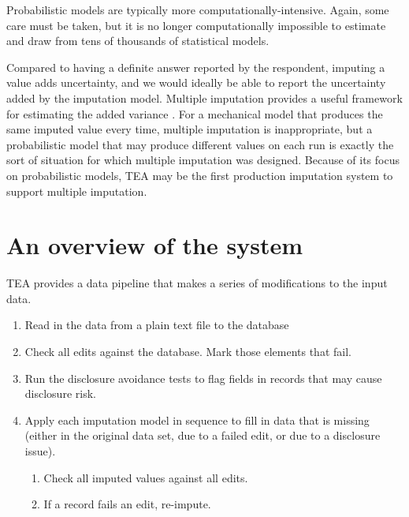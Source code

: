 \documentclass{article}
\begin{document}
Probabilistic models are typically more computationally-intensive. Again, some care
must be taken, but it is no longer computationally impossible to estimate and draw
from tens of thousands of statistical models.

Compared to having a definite answer reported by the respondent, imputing a value
adds uncertainty, and we would ideally be able to report the uncertainty added by the
imputation model. Multiple imputation provides a useful framework for estimating the
added variance \citep{multiimpute}. For a mechanical model that produces the same
imputed value every time, multiple imputation is inappropriate, but a probabilistic
model that may produce different values on each run is exactly the sort of situation
for which multiple imputation was designed. Because of its focus on probabilistic models,
TEA may be the first production imputation system to support multiple imputation.







\section{An overview of the system}

TEA provides a data pipeline that makes a series of modifications to the input data. 

\begin{enumerate}
\item Read in the data from a plain text file to the database
\item Check all edits against the database. Mark those elements that fail.
\item Run the disclosure avoidance tests to flag fields in records that may cause
disclosure risk. 
\item Apply each imputation model in sequence to fill in data that is missing (either
in the original data set, due to a failed edit, or due to a disclosure issue).
    \begin{enumerate}
        \item Check all imputed values against all edits.
        \item If a record fails an edit, re-impute.
    \end{enumerate}
\end{enumerate}
\end{document}
